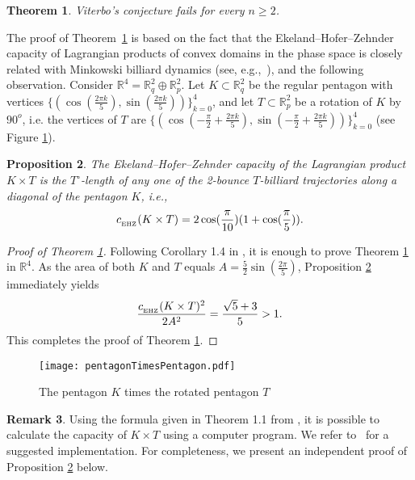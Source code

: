 \documentclass[10pt,a4paper]{article}
\newtheorem{theorem}{Theorem}[section]
\newtheorem{proposition}[theorem]{Proposition}
\theoremstyle{definition}
\newtheorem{remark}[theorem]{Remark}
\newcommand{\R}{{\mathbb{R}}}
\newcommand{\ehzcap}{c_{_{\rm EHZ}}}
\begin{document}
\begin{theorem}
\label{counterexample_thm}
Viterbo's conjecture fails 
for every 
$n \geq 2$.
\end{theorem}



The proof of Theorem~\ref{counterexample_thm} is based on 
the fact that the Ekeland--Hofer--Zehnder capacity of Lagrangian products of convex domains in the phase space is closely related with Minkowski billiard dynamics (see, e.g.,~\cite{singular_capacity}), and the following observation. Consider $\R^4 = \R^2_q \oplus \R^2_p$. Let $K \subset \R^2_q$ be the regular pentagon with vertices $\{(\cos(\frac{2\pi k}{5}), \sin(\frac{2\pi k}{5}))\}_{k=0}^4$,
and let $T \subset \R^2_p$ be a rotation of $K$ by $90^o$, i.e. the vertices of $T$ are $\{(\cos(-\frac{\pi}{2} + \frac{2\pi k}{5}), \sin(-\frac{\pi}{2} + \frac{2\pi k}{5}))\}_{k=0}^4$ (see Figure \ref{pentagonFig}).

\begin{proposition}
\label{counterexample_prop}
The Ekeland--Hofer--Zehnder capacity of the Lagrangian product $K \times T$ is the $T^{\circ}$-length of any one of the 2-bounce $T$-billiard trajectories along a diagonal of the pentagon $K$, i.e.,
$$ \ehzcap(K \times T) = 2 \cos(\frac{\pi}{10}) (1 + \cos(\frac{\pi}{5})).$$
\end{proposition}

\begin{proof}[Proof of Theorem \ref{counterexample_thm}]
Following Corollary 1.4 in \cite{p-prod}, it is enough to prove Theorem \ref{counterexample_thm} in $\R^4$.
As the area of both $K$ and $T$ equals $A = \frac{5}{2} \sin(\frac{2\pi}{5})$, Proposition \ref{counterexample_prop} immediately yields
 $$\frac{\ehzcap(K\times T)^2}{2 A^2} = \frac{\sqrt{5} + 3}{5} > 1.$$
 This completes the proof of Theorem 
 \ref{counterexample_thm}. 
\end{proof}


 \begin{figure}[H]
\centering
\texttt{[image: pentagonTimesPentagon.pdf]}
\caption{The pentagon $K$ times the rotated pentagon $T$}
\label{pentagonFig}
\end{figure}


\begin{remark}
Using the formula given in Theorem 1.1 from \cite{pazit}, it is possible to calculate the capacity of $K \times T$ using a computer program. We refer to~\cite{pazit-website} for a suggested implementation. For completeness, we present  an independent proof of Proposition \ref{counterexample_prop} below.
\end{remark}
\end{document}
